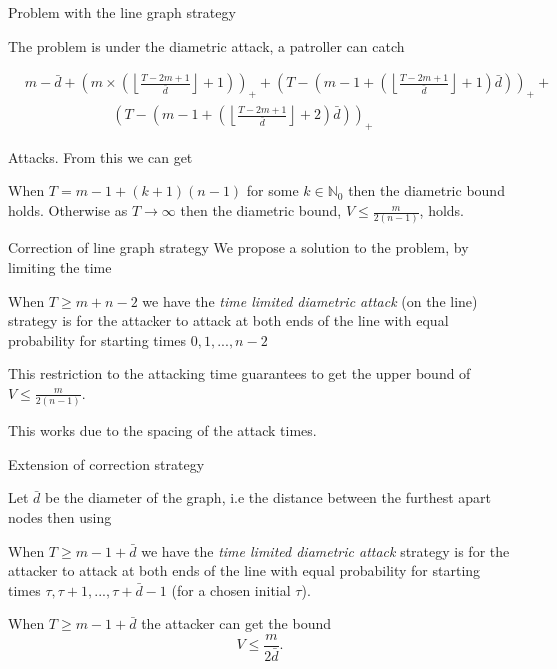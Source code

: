 \documentclass[11pt]{beamer}
\newcommand{\floor}[1]{\left \lfloor #1 \right \rfloor}
\newcommand{\pospart}[1]{\left( #1 \right)_{+}}
\begin{document}
\begin{frame}{Problem with the line graph strategy}

The problem is under the diametric attack, a patroller can catch
\tiny

\begin{align*}
&m-\bar{d}+\pospart{m \times (\floor{\frac{T-2m+1}{\bar{d}}}+1)} +  \pospart{T-(m-1+(\floor{\frac{T-2m+1}{\bar{d}}}+1)\bar{d})} +  \\
&\hspace{75pt} \pospart{T-(m-1+(\floor{\frac{T-2m+1}{\bar{d}}}+2)\bar{d})}
\end{align*}

\normalsize
Attacks. From this we can get

\begin{lemma}
When $T=m-1+(k+1)(n-1)$ for some $k \in \mathbb{N}_{0}$ then the diametric bound holds. Otherwise as $T \rightarrow \infty$ then the diametric bound, $V \leq \frac{m}{2(n-1)}$, holds.
\end{lemma}

\end{frame}

\hypertarget{Correction to Line graph strategy}{}
\begin{frame}{Correction of line graph strategy}
We propose a solution to the problem, by limiting the time

\begin{definition}
When $T \geq m+n-2$ we have the \textit{time limited diametric attack} (on the line) strategy is for the attacker to attack at both ends of the line with equal probability for starting times $0,1,...,n-2$
\end{definition}

This restriction to the attacking time guarantees to get the upper bound of $V \leq \frac{m}{2(n-1)}$. 

This works due to the spacing of the attack times.
\end{frame}

\hypertarget{Extension of correction strategy}{}
\begin{frame}{Extension of correction strategy}


Let $\bar{d}$ be the diameter of the graph, i.e the distance between the furthest apart nodes then using

\begin{definition}
When $T \geq m-1+\bar{d}$ we have the \textit{time limited diametric attack} strategy is for the attacker to attack at both ends of the line with equal probability for starting times $\tau,\tau +1,...,\tau + \bar{d}-1$ (for a chosen initial $\tau$).
\end{definition}

\begin{lemma}
When $T \geq m-1 +\bar{d}$ the attacker can get the bound
$$V \leq \dfrac{m}{2\bar{d}}.$$
\end{lemma}

\end{frame}
\end{document}
